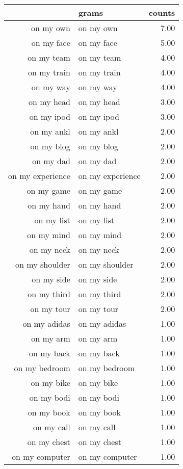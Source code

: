\begin{table}[ht]
\centering
\begin{tabular}{rlr}
  \hline
 & grams & counts \\ 
  \hline
on my own & on my own & 7.00 \\ 
  on my face & on my face & 5.00 \\ 
  on my team & on my team & 4.00 \\ 
  on my train & on my train & 4.00 \\ 
  on my way & on my way & 4.00 \\ 
  on my head & on my head & 3.00 \\ 
  on my ipod & on my ipod & 3.00 \\ 
  on my ankl & on my ankl & 2.00 \\ 
  on my blog & on my blog & 2.00 \\ 
  on my dad & on my dad & 2.00 \\ 
  on my experience & on my experience & 2.00 \\ 
  on my game & on my game & 2.00 \\ 
  on my hand & on my hand & 2.00 \\ 
  on my list & on my list & 2.00 \\ 
  on my mind & on my mind & 2.00 \\ 
  on my neck & on my neck & 2.00 \\ 
  on my shoulder & on my shoulder & 2.00 \\ 
  on my side & on my side & 2.00 \\ 
  on my third & on my third & 2.00 \\ 
  on my tour & on my tour & 2.00 \\ 
  on my adidas & on my adidas & 1.00 \\ 
  on my arm & on my arm & 1.00 \\ 
  on my back & on my back & 1.00 \\ 
  on my bedroom & on my bedroom & 1.00 \\ 
  on my bike & on my bike & 1.00 \\ 
  on my bodi & on my bodi & 1.00 \\ 
  on my book & on my book & 1.00 \\ 
  on my call & on my call & 1.00 \\ 
  on my chest & on my chest & 1.00 \\ 
  on my computer & on my computer & 1.00 \\ 

\end{tabular}
\end{table}
